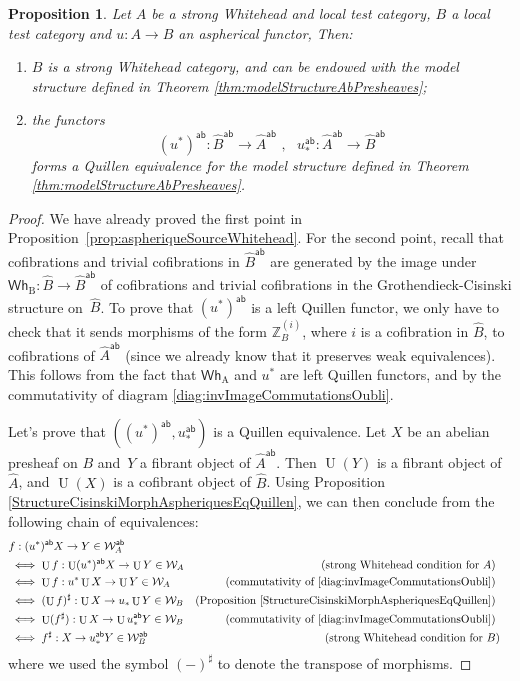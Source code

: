 \documentclass[10pt, english, a4paper, nothms]{amsart}
\theoremstyle{plain}
\newtheorem{prop}[theorem]{Proposition}
\theoremstyle{remark}
\theoremstyle{definition}
\numberwithin{equation}{theorem}
\newcommand\Z{\mathbb{Z}}
\newcommand{\pref}[1]{{\widehat{ #1 }}}
\newcommand{\W}{\mathcal{W}}
\newcommand{\ab}{{\mathsf{ab}}}
\newcommand{\Whf}[1]{\operatorname{\mathsf{Wh}_{#1}}}
\newcommand{\prefab}[1]{\widehat{ #1 }^{\mathsf{ab}}}
\newcommand{\Wab}{\W^{\ab}}
\DeclareMathOperator{\U}{U}
\newcommand{\mdvirg}{\text{ ,}\hspace{10pt}}
\begin{document}
\begin{prop}\label{prop:foncteurAspheriqueEqQuillenAb}
Let $A$ be a strong Whitehead and local test category, $B$ a local test
category and $u: A \to B$ an aspherical functor, Then:
\begin{enumerate}
\item $B$ is a strong Whitehead category, and can be endowed with the model
structure defined in Theorem \ref{thm:modelStructureAbPresheaves};
\item the functors
\[
  (u^*)^\ab: \prefab{B} \to \prefab{A}\mdvirg u_*^\ab: \prefab{A} \to
  \prefab{B}
\]
forms a Quillen equivalence for the model structure defined in Theorem
\ref{thm:modelStructureAbPresheaves}.
\end{enumerate}
\end{prop}
\begin{proof}
We have already proved the first point in
Proposition~\ref{prop:aspheriqueSourceWhitehead}. For the second point,
recall that cofibrations and trivial cofibrations in $\prefab{B}$
are generated by the image under $\Whf{B}: \pref{B} \to \prefab{B}$
of cofibrations and trivial cofibrations in the Grothendieck-Cisinski
structure  on~$\pref{B}$. To prove that $(u^*)^\ab$ is a left Quillen
functor, we only have to check that it sends morphisms of the form
$\Z_B^{(i)}$, where $i$ is a cofibration in $\pref{B}$, 
to cofibrations of $\prefab{A}$ (since we already know that it preserves weak
equivalences). This follows from the fact that
$\Whf{A}$ and $u^*$ are left Quillen functors, and by the
commutativity of diagram \ref{diag:invImageCommutationsOubli}.

Let's prove that $((u^*)^\ab, u^\ab_*)$ is a Quillen equivalence. Let $X$ be an
abelian presheaf on ${B}$ and~$Y$ a fibrant object of $\prefab{A}$.
Then $\U(Y)$ is a fibrant object of $\pref{A}$, and $\U(X)$ is a cofibrant
object of $\pref{B}$. Using Proposition
\ref{StructureCisinskiMorphAspheriquesEqQuillen}, we can then conclude
from the following chain of equivalences:
\begin{align*}
& f: (u^*)^\ab X \to Y \in \Wab_A \\
&\iff \U f: \U(u^*)^\ab X \to \U Y \in \W_A & (\text{strong Whitehead
condition for } A)
\\
&\iff \U f: u^*\U X \to \U Y \in \W_A 
&(\text{commutativity of \ref{diag:invImageCommutationsOubli}})
\\
&\iff (\U f)^\sharp: \U X \to u_*\U Y \in \W_B
&(\text{Proposition } \ref{StructureCisinskiMorphAspheriquesEqQuillen})
\\
&\iff \U(f^\sharp): \U X \to \U u_*^\ab Y \in \W_B
&(\text{commutativity of \ref{diag:invImageCommutationsOubli}})
\\
&\iff f^\sharp: X \to u_*^{\ab} Y \in \Wab_B &(\text{strong Whitehead
condition for }B & )
\end{align*}
where we used the symbol $(-)^\sharp$ to denote the transpose of morphisms.
\end{proof}
\end{document}
